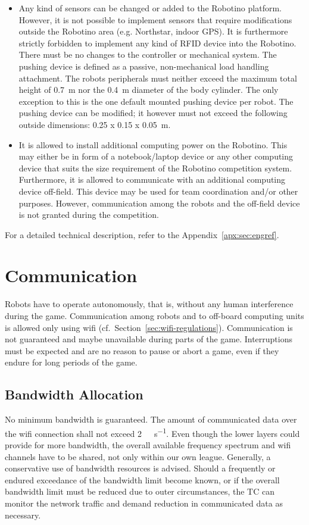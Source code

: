 \documentclass[12pt,twoside]{article}
\newcommand{\Robotino}{Robotino\textregistered}
\newcommand{\refsec}[1]{Section~\ref{#1}}
\begin{document}
\begin{itemize}
\item Any kind of sensors can be changed or added to the Robotino
  platform.  However, it is not possible to implement sensors that
  require modifications outside the Robotino area (e.g. Northstar,
  indoor GPS).  It is furthermore strictly forbidden to implement any
  kind of RFID device into the Robotino. There must be no changes to
  the controller or mechanical system. The pushing device is defined
  as a passive, non-mechanical load handling attachment. The robots
  peripherals must neither exceed the maximum total height of
  \SI{0.7}{\metre} nor the \SI{0.4}{\metre} diameter of the body
  cylinder. The only exception to this is the one default mounted
  pushing device per robot. The pushing device can be modified; it
  however must not exceed the following outside dimensions: \SI{0.25 x
    0.15 x 0.05}{\metre}.
\item It is allowed to install additional computing power on the
  \Robotino. This may either be in form of a notebook/laptop device or
  any other computing device that suits the size requirement of the
  \Robotino{} competition system. Furthermore, it is allowed to
  communicate with an additional computing device off-field. This
  device may be used for team coordination and/or other
  purposes. However, communication among the robots and the off-field
  device is not granted during the competition.
\end{itemize}

For a detailed technical description, refer to the
Appendix~\ref{apx:sec:engref}.

\section{Communication}
Robots have to operate autonomously, that is, without any human
interference during the game. Communication among robots and to
off-board computing units is allowed only using wifi
(cf.~\refsec{sec:wifi-regulations}). Communication is not guaranteed
and maybe unavailable during parts of the game. Interruptions must be
expected and are no reason to pause or abort a game, even if they
endure for long periods of the game.

\subsection{Bandwidth Allocation}
\label{sec:bandwidth}
No minimum bandwidth is guaranteed. The amount of communicated data
over the wifi connection shall not exceed
\SI{2}{\mega\bit\per\second}. Even though the lower layers could
provide for more bandwidth, the overall available frequency spectrum
and wifi channels have to be shared, not only within our own
league. Generally, a conservative use of bandwidth resources is
advised. Should a frequently or endured exceedance of the bandwidth
limit become known, or if the overall bandwidth limit must be reduced
due to outer circumstances, the TC can monitor the network traffic and
demand reduction in communicated data as necessary.
\end{document}
